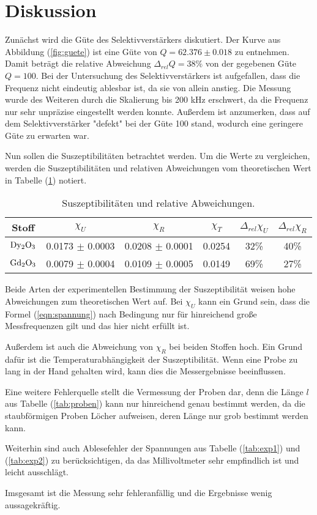 \newpage
\section{Diskussion}
\label{sec:Diskussion}
\noindent
Zunächst wird die Güte des Selektivverstärkers diskutiert.
Der Kurve aus Abbildung (\ref{fig:guete}) ist eine Güte von $ Q = 62.376 \pm 0.018 $ zu entnehmen.
Damit beträgt die relative Abweichung $\Delta_{rel} Q = 38\%$ von der gegebenen Güte $Q=100$.
Bei der Untersuchung des Selektivverstärkers ist aufgefallen, 
dass die Frequenz nicht eindeutig ablesbar ist, da sie von allein anstieg.
Die Messung wurde des Weiteren durch die Skalierung bis 200 kHz erschwert, da die Frequenz nur sehr unpräzise eingestellt werden konnte.
Außerdem ist anzumerken, dass auf dem Selektivverstärker "defekt" bei der Güte 100 stand,
wodurch eine geringere Güte zu erwarten war.

\noindent
Nun sollen die Suszeptibilitäten betrachtet werden.
Um die Werte zu vergleichen, werden die Suszeptibilitäten und relativen Abweichungen vom theoretischen Wert in Tabelle (\ref{tab:disk}) notiert.

\begin{table}
    \centering
    \caption{Suszeptibilitäten und relative Abweichungen.}
    \begin{tabular}{c c c c c c}
        \toprule
        {Stoff} & {$\chi_U $} & {$\chi_R $} & {$\chi_T$} & {$\Delta_{rel}\chi_U$} & {$\Delta_{rel}\chi_R$} \\
    \midrule
    $\ce{Dy2O3}$ & 0.0173 $\pm$ 0.0003  & 0.0208 $\pm$ 0.0001 & 0.0254 & 32\% & 40\% \\
    $\ce{Gd2O3}$ & 0.0079 $\pm$ 0.0004  & 0.0109 $\pm$ 0.0005 & 0.0149 & 69\% & 27\% \\
    \bottomrule
\end{tabular}

\label{tab:disk}
\end{table}

\noindent
Beide Arten der experimentellen Bestimmung der Suszeptibilität weisen hohe Abweichungen zum theoretischen Wert auf. 
Bei $\chi_U$ kann ein Grund sein, dass die Formel (\ref{eqn:spannung}) nach Bedingung nur für hinreichend große Messfrequenzen gilt und das hier nicht erfüllt ist.

\noindent
Außerdem ist auch die Abweichung von $\chi_R$ bei beiden Stoffen hoch.
Ein Grund dafür ist die Temperaturabhängigkeit der Suszeptibilität.
Wenn eine Probe zu lang in der Hand gehalten wird, kann dies die Messergebnisse beeinflussen.

\noindent
Eine weitere Fehlerquelle stellt die Vermessung der Proben dar, denn die Länge $l$ aus Tabelle (\ref{tab:proben}) kann nur
hinreichend genau bestimmt werden, da die staubförmigen Proben Löcher aufweisen, deren Länge nur grob bestimmt werden kann.

\noindent
Weiterhin sind auch Ablesefehler der Spannungen aus Tabelle (\ref{tab:exp1}) und (\ref{tab:exp2}) zu berücksichtigen, da das Millivoltmeter sehr empfindlich ist und leicht ausschlägt.

\noindent
Imsgesamt ist die Messung sehr fehleranfällig und die Ergebnisse wenig aussagekräftig.


